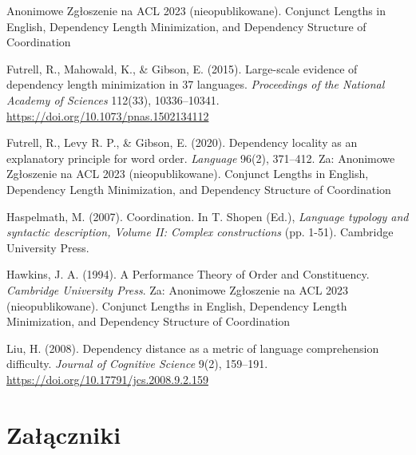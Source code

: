 \documentclass[licencjacka]{pracamgr_Kogni}
\begin{document}
\begin{thebibliography}{99}

Anonimowe Zgłoszenie na ACL 2023 (nieopublikowane). Conjunct Lengths in English, Dependency Length Minimization, and Dependency Structure of Coordination

Futrell, R., Mahowald, K., \& Gibson, E. (2015). Large-scale evidence of dependency length minimization in 37 languages. \textit{Proceedings of the National Academy of Sciences} 112(33), 10336–10341. \url{https://doi.org/10.1073/pnas.1502134112}

Futrell, R., Levy R. P., \& Gibson, E. (2020). Dependency locality as an explanatory principle for word order. \textit{Language} 96(2), 371–412. Za: Anonimowe Zgłoszenie na ACL 2023 (nieopublikowane). Conjunct Lengths in English, Dependency Length Minimization, and Dependency Structure of Coordination

Haspelmath, M. (2007). Coordination. In T. Shopen (Ed.), \textit{Language typology and syntactic description, Volume II: Complex constructions} (pp. 1-51). Cambridge University Press.

Hawkins, J. A. (1994). A Performance Theory of Order and Constituency. \textit{Cambridge University Press}. Za: Anonimowe Zgłoszenie na ACL 2023 (nieopublikowane). Conjunct Lengths in English, Dependency Length Minimization, and Dependency Structure of Coordination

Liu, H. (2008). Dependency distance as a metric of language comprehension difficulty. \textit{Journal of Cognitive Science} 9(2), 159–191. \url{https://doi.org/10.17791/jcs.2008.9.2.159}

\end{thebibliography}


\chapter*{Załączniki}
\end{document}
